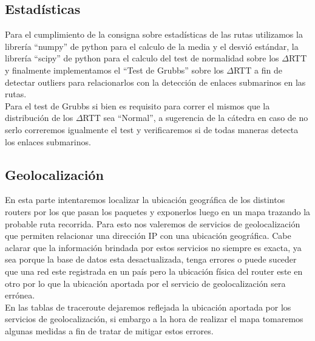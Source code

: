 \subsection{Estadísticas}

Para el cumplimiento de la consigna sobre estadísticas de las rutas utilizamos la librería ``numpy'' de python para el calculo de la media y el desvió estándar, la librería ``scipy'' de python para el calculo del test de normalidad sobre los $\Delta$RTT y finalmente implementamos el ``Test de Grubbs'' sobre los $\Delta$RTT a fin de detectar outliers para relacionarlos con la detección de enlaces submarinos en las rutas.\\
Para el test de Grubbs si bien es requisito para correr el mismos que la distribución de los $\Delta$RTT sea ``Normal'', a sugerencia de la cátedra en caso de no serlo correremos igualmente el test y verificaremos si de todas maneras detecta los enlaces submarinos.

\subsection{Geolocalización}

En esta parte intentaremos localizar la ubicación geográfica de los distintos routers por los que pasan los paquetes y exponerlos luego en un mapa trazando la probable ruta recorrida.
Para esto nos valeremos de servicios de geolocalización que permiten relacionar una dirección IP con una ubicación geográfica.
Cabe aclarar que la información brindada por estos servicios no siempre es exacta, ya sea porque la base de datos esta desactualizada, tenga errores o puede suceder que una red este registrada en un país pero la ubicación física del router este en otro por lo que la ubicación aportada por el servicio de geolocalización sera errónea.\\
En las tablas de traceroute dejaremos reflejada la ubicación aportada por los servicios de geolocalización, si embargo a la hora de realizar el mapa tomaremos algunas medidas a fin de tratar de mitigar estos errores.

